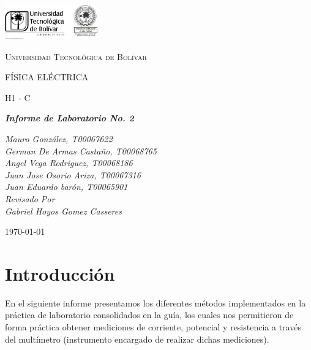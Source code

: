 \documentclass[letterpaper, 12pt]{report}
\begin{document}
\begin{titlepage}
	\centering
	\includegraphics[width=0.3\textwidth]{Images/logo_utb.png}\par\vspace{1cm}
	{\scshape\LARGE Universidad Tecnológica de Bolívar \par}
	\vspace{1cm}

	{\scshape\Large FÍSICA ELÉCTRICA \par}
	\vspace{.2cm}

	{\scshape\Large H1 - C \par}
	\vspace{1cm}
	\slshape {\Large \bfseries{}Informe de Laboratorio No. 2 \\}
	\vspace{1cm}

	\slshape {\itshape{} Mauro González, T00067622 \\}
	\slshape {\itshape{} German De Armas Castaño, T00068765 \\}
	\slshape {\itshape{} Angel Vega Rodriguez, T00068186 \\}
	\slshape {\itshape{} Juan Jose Osorio Ariza, T00067316 \\}
	\slshape {\itshape{} Juan Eduardo barón, T00065901 \\}
	\vfill
	Revisado Por \\
	Gabriel Hoyos Gomez Casseres\\
	{\large \today\par}
\end{titlepage}

\section{Introducción}

En el siguiente informe presentamos los diferentes métodos implementados en
la práctica de laboratorio consolidados en la guía, los cuales nos permitieron
de forma práctica obtener mediciones de corriente, potencial y resistencia a
través del multímetro (instrumento encargado de realizar dichas mediciones).

\vspace{.5cm}
\end{document}
